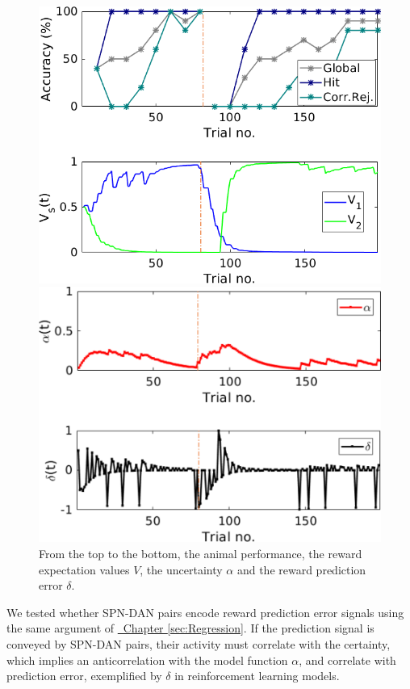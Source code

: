 \begin{figure}
    \centering
    \includegraphics[scale=0.7]{figures/PavPerfV2.png}
    
    \vspace{0.5cm}
    
    \includegraphics[scale=0.7]{figures/PavAlphaDelta1.pdf}
    \caption{From the top to the bottom, the animal performance, the reward expectation values $V$, the uncertainty $\alpha$ and the reward prediction error $\delta$.}
    \label{fig:PavRL_ex}
\end{figure}
We tested whether SPN-DAN pairs encode reward prediction error signals using the same argument of \hyperref[sec:Regression]{~Chapter \ref*{sec:Regression}}. If the prediction signal is conveyed by SPN-DAN pairs, their activity must correlate with the certainty, which implies an anticorrelation with the model function $\alpha$, and correlate with prediction error, exemplified by $\delta$ in reinforcement learning models.\\

